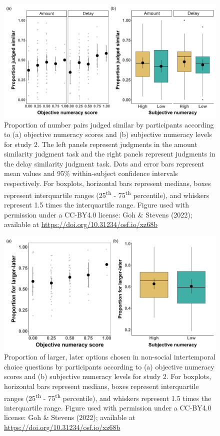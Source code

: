 \documentclass[
  doc,floatsintext]{apa6}
\begin{document}
\begin{figure}
\includegraphics[width=1\linewidth]{figures/numeracy_judgments_2} \caption{Proportion of number pairs judged similar by participants according to (a) objective numeracy scores and (b) subjective numeracy levels for study 2. The left panels represent judgments in the amount similarity judgment task and the right panels represent judgments in the delay similarity judgment task. Dots and error bars represent mean values and 95\% within-subject confidence intervals respectively. For boxplots, horizontal bars represent medians, boxes represent interquartile ranges (25\textsuperscript{th} - 75\textsuperscript{th} percentile), and whiskers represent 1.5 times the interquartile range. Figure used with permission under a CC-BY4.0 license: Goh \& Stevens (2022); available at \url{https://doi.org/10.31234/osf.io/xz68b}}\label{fig:numeracyjudgments2}
\end{figure}



\begin{figure}
\includegraphics[width=1\linewidth]{figures/numeracy_itc_2} \caption{Proportion of larger, later options chosen in non-social intertemporal choice questions by participants according to (a) objective numeracy scores and (b) subjective numeracy levels for study 2. For boxplots, horizontal bars represent medians, boxes represent interquartile ranges (25\textsuperscript{th} - 75\textsuperscript{th} percentile), and whiskers represent 1.5 times the interquartile range. Figure used with permission under a CC-BY4.0 license: Goh \& Stevens (2022); available at \url{https://doi.org/10.31234/osf.io/xz68b}}\label{fig:numeracyitc2}
\end{figure}
\end{document}
